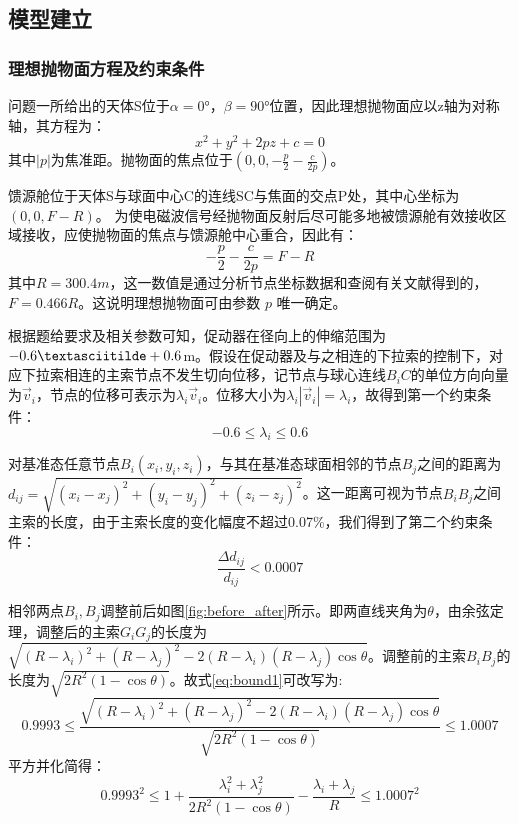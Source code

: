 \documentclass[withoutpreface,bwprint,fontset=macnew]{cumcmthesis} %
\begin{document}
	\subsection{模型建立}
	\subsubsection{理想抛物面方程及约束条件}
	问题一所给出的天体S位于$\alpha=0°$，$\beta=90°$位置，因此理想抛物面应以z轴为对称轴，其方程为：
	\begin{equation}
		x^2 + y^2 + 2pz + c = 0
		\label{eq:paraboloid}
	\end{equation}
	其中$|p|$为焦准距。抛物面的焦点位于$(0, 0, -\frac{p}{2}-\frac{c}{2p})$。
	
	
	馈源舱位于天体S与球面中心C的连线SC与焦面的交点P处，其中心坐标为$(0, 0, F-R)$。
	为使电磁波信号经抛物面反射后尽可能多地被馈源舱有效接收区域接收，应使抛物面的焦点与馈源舱中心重合，因此有：
	\begin{equation}
		-\frac{p}{2}-\frac{c}{2p} = F-R
		\label{eq:foci}
	\end{equation}
	其中$R = 300.4m$，这一数值是通过分析节点坐标数据和查阅有关文献得到的，$F = 0.466R$。这说明理想抛物面可由参数 $p$ 唯一确定。
	
	根据题给要求及相关参数可知，促动器在径向上的伸缩范围为$-0.6 \textasciitilde +0.6$m。假设在促动器及与之相连的下拉索的控制下，对应下拉索相连的主索节点不发生切向位移，记节点与球心连线$B_{i} C$的单位方向向量为$\vec{v}_i$，节点的位移可表示为$\lambda_i \vec{v}_i$。位移大小为$\lambda_i|\vec{v}_i| = \lambda_i$，故得到第一个约束条件：
	\begin{equation}
		-0.6 \leq \lambda_i \leq 0.6
		\label{eq:bound2}
	\end{equation}

	对基准态任意节点$B_{i}(x_i, y_i, z_i)$，与其在基准态球面相邻的节点$B_{j}$之间的距离为$d_{ij} = \sqrt{(x_i-x_j)^2+(y_i-y_j)^2+(z_i-z_j)^2}$。这一距离可视为节点$B_{i}B_{j}$之间主索的长度，由于主索长度的变化幅度不超过0.07\%，我们得到了第二个约束条件：
	\begin{equation}
		\frac{\Delta d_{ij}}{d_{ij}}< 0.0007
		\label{eq:bound1}
	\end{equation}
	
	相邻两点$B_{i},B_{j}$调整前后如图\ref {fig:before_after}所示。即两直线夹角为$\theta$，由余弦定理，调整后的主索$G_{i}G_{j}$的长度为$\sqrt{(R-\lambda_i)^2+(R-\lambda_j)^2-2(R-\lambda_i)(R-\lambda_j)\cos\theta}$。调整前的主索$B_{i}B_{j}$的长度为$\sqrt{2R^2(1-\cos\theta)}$。故式\ref {eq:bound1}可改写为:
	$$0.9993 \leq \frac{\sqrt{(R-\lambda_i)^2+(R-\lambda_j)^2-2(R-\lambda_i)(R-\lambda_j)\cos\theta}}{\sqrt{2R^2(1-\cos\theta)}} \leq 1.0007$$
	平方并化简得：
	\begin{equation}
		0.9993^2 \leq 1+\frac{\lambda_i^2+\lambda_j^2}{2R^2(1-\cos\theta)}-\frac{\lambda_i+\lambda_j}{R} \leq 1.0007^2
		\label{eq:bound1_transform}
	\end{equation}
	
\end{document}
